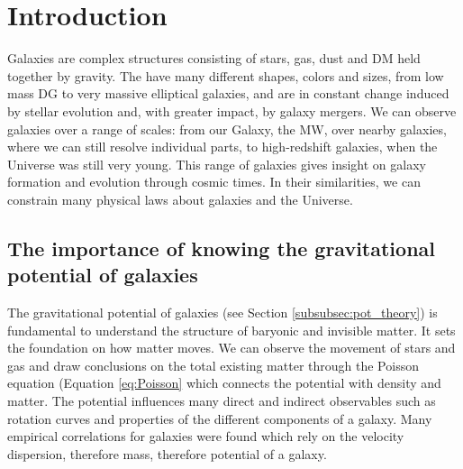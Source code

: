 \section{Introduction}\label{sec:Intro}
Galaxies are complex structures consisting of stars, gas, dust and \ac{DM} held together by gravity. The have many different shapes, colors and sizes, from low mass \ac{DG} to very massive elliptical galaxies, and are in constant change induced by stellar evolution and, with greater impact, by galaxy mergers. We can observe galaxies over a range of scales: from our Galaxy, the \ac{MW}, over nearby galaxies, where we can still resolve individual parts, to high-redshift galaxies, when the Universe was still very young. This range of galaxies gives insight on galaxy formation and evolution through cosmic times. In their similarities, we can constrain many physical laws about galaxies and the Universe. 

\subsection{The importance of knowing the gravitational potential of galaxies}
The gravitational potential of galaxies (see Section \ref{subsubsec:pot_theory}) is fundamental to understand the structure of baryonic and invisible matter. It sets the foundation on how matter moves. We can observe the movement of stars and gas and draw conclusions on the total existing matter through the Poisson equation (Equation \ref{eq:Poisson} which connects the potential with density and matter. The potential influences many direct and indirect observables such as rotation curves and properties of the different components of a galaxy. Many empirical correlations for galaxies were found which rely on the velocity dispersion, therefore mass, therefore potential of a galaxy. 


